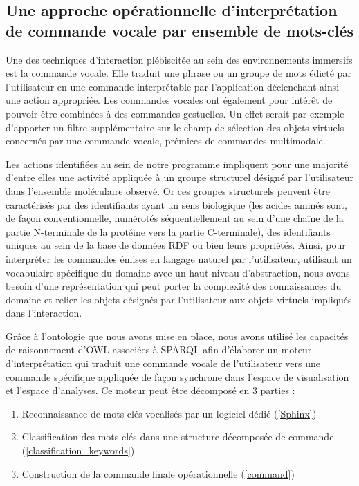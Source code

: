 \subsection{Une approche opérationnelle d'interprétation de commande vocale par ensemble de mots-clés}

Une des techniques d'interaction plébiscitée au sein des environnements immersifs est la commande vocale. Elle traduit une phrase ou un groupe de mots édicté par l'utilisateur en une commande interprétable par l'application déclenchant ainsi une action appropriée. Les commandes vocales ont également pour intérêt de pouvoir être combinées à des commandes gestuelles. Un effet serait par exemple d'apporter un filtre supplémentaire sur le champ de sélection des objets virtuels concernés par une commande vocale, prémices de commandes multimodale.

Les actions identifiées au sein de notre programme impliquent pour une majorité d'entre elles une activité appliquée à un groupe structurel désigné par l'utilisateur dans l'ensemble moléculaire observé. Or ces groupes structurels peuvent être caractérisés par des identifiants ayant un sens biologique (les acides aminés sont, de façon conventionnelle, numérotés séquentiellement au sein d'une chaîne de la partie N-terminale de la protéine vers la partie C-terminale), des identifiants uniques au sein de la base de données RDF ou bien leurs propriétés. Ainsi, pour interpréter les commandes émises en langage naturel par l'utilisateur, utilisant un vocabulaire spécifique du domaine avec un haut niveau d'abstraction, nous avons besoin d'une représentation qui peut porter la complexité des connaissances du domaine et relier les objets désignés par l'utilisateur aux objets virtuels impliqués dans l'interaction.

Grâce à l'ontologie que nous avons mise en place, nous avons utilisé les capacités de raisonnement d'OWL associées à SPARQL afin d'élaborer un moteur d'interprétation qui traduit une commande vocale de l'utilisateur vers une commande spécifique appliquée de façon synchrone dans l'espace de visualisation et l'espace d'analyses.
Ce moteur peut être décomposé en 3 parties :

\begin{enumerate}
  \item Reconnaissance de mots-clés vocalisés par un logiciel dédié (\ref{Sphinx})
  \item Classification des mots-clés dans une structure décomposée de commande (\ref{classification_keywords})
  \item Construction de la commande finale opérationnelle (\ref{command})
\end{enumerate}

